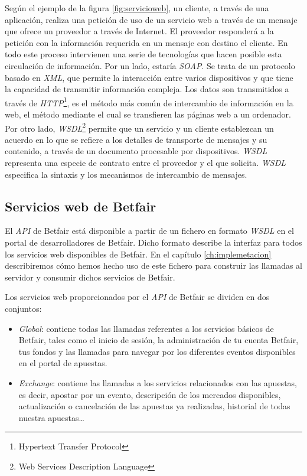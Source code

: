          Según el ejemplo de la figura \ref{fig:servicioweb}, un cliente, a través de una aplicación, realiza una petición de uso de un servicio web a través de un mensaje que ofrece un proveedor a través de Internet. El proveedor responderá a la petición con la información requerida en un mensaje con destino el cliente. En todo este proceso intervienen una serie de tecnologías que hacen posible esta circulación de información. Por un lado, estaría \emph{SOAP}. Se trata de un protocolo basado en \emph{XML}, que permite la interacción entre varios dispositivos y que tiene la capacidad de transmitir información compleja. Los datos son transmitidos a través de \emph{HTTP}\footnote{Hypertext Transfer Protocol}, es el método más común de intercambio de información en la web, el método mediante el cual se transfieren las páginas web a un ordenador. 
          Por otro lado, \emph{WSDL}\footnote{Web Services Description Language} permite que un servicio y un cliente establezcan un acuerdo en lo que se refiere a los detalles de transporte de mensajes y su contenido, a través de un documento procesable por dispositivos. \emph{WSDL} representa una especie de contrato entre el proveedor y el que solicita. \emph{WSDL} especifica la sintaxis y los mecanismos de intercambio de mensajes.
                    
 \subsection{Servicios web de Betfair }
 	El \emph{API} de Betfair está disponible a partir de un fichero en formato \emph{WSDL} en el portal de desarrolladores de Betfair. Dicho formato describe la interfaz para todos los servicios web disponibles de Betfair. En el capítulo \ref{ch:implemetacion} describiremos cómo hemos hecho uso de este fichero para construir las llamadas al servidor y consumir dichos servicios de Betfair.

 Los servicios web proporcionados por el \emph{API} de Betfair se dividen en dos conjuntos: 
          
\begin{itemize}
	\item \emph{Global}: contiene todas las llamadas referentes a los servicios básicos de Betfair, tales como el inicio de sesión, la administración de tu cuenta Betfair, tus fondos y las llamadas para navegar por los diferentes eventos disponibles en el portal de apuestas. 
	\item \emph{Exchange}: contiene las llamadas a los servicios relacionados con las apuestas, es decir, apostar por un evento, descripción de los mercados disponibles, actualización o cancelación de las apuestas ya realizadas, historial de todas nuestra apuestas\ldots 
\end{itemize}

